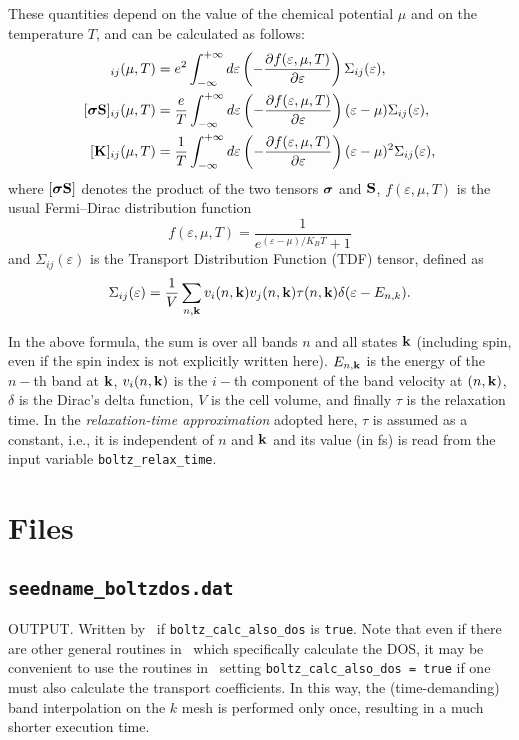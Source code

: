 These quantities depend on the value of the chemical potential $\mu$ and on the temperature $T$, and can be calculated as follows:
\begin{align}
  [\bvec \sigma]_{ij}(\mu,T)&=e^2 \int_{-\infty}^{+\infty} d\varepsilon \left(-\frac {\partial f(\varepsilon,\mu,T)}{\partial \varepsilon}\right)\Sigma_{ij}(\varepsilon), \\
  [\bvec \sigma \bvec S]_{ij}(\mu,T)&=\frac e T \int_{-\infty}^{+\infty} d\varepsilon \left(-\frac {\partial f(\varepsilon,\mu,T)}{\partial \varepsilon}\right)(\varepsilon-\mu)\Sigma_{ij}(\varepsilon), \label{eq:boltz-sigmas}\\
  [\bvec K]_{ij}(\mu,T)&=\frac 1 T \int_{-\infty}^{+\infty} d\varepsilon \left(-\frac {\partial f(\varepsilon,\mu,T)}{\partial \varepsilon}\right)(\varepsilon-\mu)^2 \Sigma_{ij}(\varepsilon),\label{eq:boltz-thermcond}
\end{align}
where $[\bm{\mathrm{\sigma}} \bm{\mathrm{S}}]$ denotes the product of the two tensors $\bm{\mathrm{\sigma}}$ and $\bm{\mathrm{S}}$, $f(\varepsilon,\mu,T)$ is the usual Fermi--Dirac distribution function 
\begin{equation*}
  f(\varepsilon,\mu,T) = \frac{1}{e^{(\varepsilon-\mu)/K_B T}+1}
\end{equation*}
and $\Sigma_{ij}(\varepsilon)$ is the Transport Distribution Function (TDF) tensor, defined as
\begin{equation*}
  \Sigma_{ij}(\varepsilon) = \frac 1 V \sum_{n,\bm{\mathrm{k}}} v_i(n,\bm{\mathrm{k}}) v_j(n,\bm{\mathrm{k}}) \tau(n,\bm{\mathrm{k}}) \delta(\varepsilon - E_{n,k}).
\end{equation*}

In the above formula, the sum is over all bands $n$ and all states $\bm{\mathrm{k}}$ (including spin, even if the spin index is not explicitly written here). $E_{n,\bm{\mathrm{k}}}$ is the energy of the $n-$th band at $\bm{\mathrm{k}}$, $v_i(n,\bm{\mathrm{k}})$ is the $i-$th component of the band velocity at $(n,\bm{\mathrm{k}})$, $\delta$ is the Dirac's delta function, $V$ is the cell volume, and finally $\tau$ is the relaxation time. In the \emph{relaxation-time approximation} adopted here, $\tau$ is assumed as a constant, i.e., it is independent of $n$ and $\bm{\mathrm{k}}$ and its value (in fs) is read from the input variable \verb#boltz_relax_time#.

\section{Files}
\subsection{{\tt seedname\_boltzdos.dat}}
OUTPUT. Written by \postw\ if {\tt boltz\_calc\_also\_dos} is \verb#true#. Note that even if there are other general routines in \postw\ which specifically calculate the DOS, it may be convenient to use the routines in \bw\ setting {\tt boltz\_calc\_also\_dos = true} if one must also calculate the transport coefficients. In this way, the (time-demanding) band interpolation on the $k$ mesh is performed only once, resulting in a much shorter execution time.

